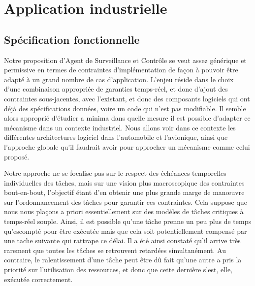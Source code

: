 \documentclass[french, a4paper, 11pt, twoside, pdftex]{StyleThese}
\begin{document}
\section{Application industrielle}
    \subsection{Spécification fonctionnelle}
    	Notre proposition d'Agent de Surveillance et Contrôle se veut assez générique et permissive en termes de contraintes d'implémentation de façon à pouvoir être adapté à un grand nombre de cas d'application. L'enjeu réside dans le choix d'une combinaison appropriée de garanties temps-réel, et donc d'ajout des contraintes sous-jacentes, avec l'existant, et donc des composants logiciels qui ont déjà des spécifications données, voire un code qui n'est pas modifiable. Il semble alors approprié d'étudier a minima dans quelle mesure il est possible d'adapter ce mécanisme dans un contexte industriel. Nous allons voir dans ce contexte les différentes architectures logiciel dans l'automobile et l'avionique, ainsi que l'approche globale qu'il faudrait avoir pour approcher un mécanisme comme celui proposé.
    	
    	Notre approche ne se focalise pas sur le respect des échéances temporelles individuelles des tâches, mais sur une vision plus macroscopique des contraintes bout-en-bout, l'objectif étant d'en obtenir une plus grande marge de manœuvre sur l'ordonnancement des tâches pour garantir ces contraintes. Cela suppose que nous nous plaçons a priori essentiellement sur des modèles de tâches critiques à temps-réel souple. Ainsi, il est possible qu'une tâche prenne un peu plus de temps qu'escompté pour être exécutée mais que cela soit potentiellement compensé par une tache suivante qui rattrape ce délai. Il a été ainsi constaté qu'il arrive très rarement que toutes les tâches se retrouvent retardées simultanément. Au contraire, le ralentissement d'une tâche peut être dû fait qu'une autre a pris la priorité sur l'utilisation des ressources, et donc que cette dernière s'est, elle, exécutée correctement. 
    	
\end{document}

